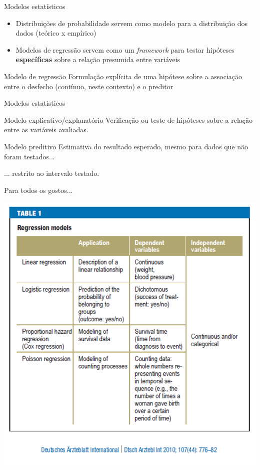 \documentclass{beamer}
\begin{document}
\begin{frame}{\scriptsize Modelos estatísticos}
  \begin{itemize}
    \footnotesize
  \item Distribuições de probabilidade servem como modelo para a distribuição dos dados (teórico x empírico)
    \bigskip
  \item Modelos de regressão servem como um {\em framework} para testar hipóteses {\bf específicas} sobre a relação presumida entre variáveis
  \end{itemize}
  \vfill
  \begin{block}{Modelo de regressão}
    \footnotesize
    Formulação explícita de uma hipótese sobre a associação entre o desfecho (contínuo, neste contexto) e o preditor
  \end{block}
\end{frame}

\begin{frame}{\scriptsize Modelos estatísticos}
  \begin{block}{Modelo explicativo/explanatório}
    \footnotesize
    Verificação ou teste de hipóteses sobre a relação entre as variáveis avaliadas.
  \end{block}
  \bigskip
  \begin{block}{Modelo preditivo}
    \footnotesize
    Estimativa do resultado esperado, mesmo para dados que não foram testados...

    \bigskip
    \footnotesize
    ... restrito ao intervalo testado.
  \end{block}
\end{frame}

\begin{frame}{\scriptsize Para todos os gostos...}
  \begin{center}
    \includegraphics[height=\textheight]{Cap18-19/modelos-table1}
  \end{center}
\end{frame}
\end{document}
